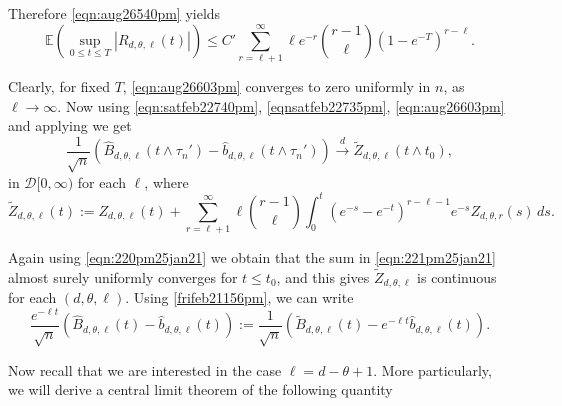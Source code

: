 \documentclass[11pt]{article}
\def\tod{\stackrel{d}{\longrightarrow}}
\newcommand{\cD}{\mathcal{D}}
\def\tod{\stackrel{d}{\longrightarrow}}
\begin{document}
Therefore \eqref{eqn:aug26540pm} yields 
\begin{equation}\label{eqn:aug26603pm}
\mathbb{E}\left( \sup_{0\leq t\leq T}\left|R_{d,\theta,\ell}(t)\right|\right) \leq C'  \sum_{r=\ell+1}^{\infty}\ell e^{-r} {r-1\choose \ell} (1-e^{-T})^{r-\ell}.
\end{equation}


Clearly, for fixed $T$, \eqref{eqn:aug26603pm} converges to zero uniformly in $n$, as $\ell \rightarrow \infty$. Now using \eqref{eqn:satfeb22740pm}, \eqref{eqnsatfeb22735pm}, \eqref{eqn:aug26603pm} and applying \cite[Theorem 4.2]{billingsley2013convergence} we get
\begin{equation*}%
     \frac{1}{\sqrt{n}}\left(\widehat{B}_{d,\theta,\ell}(t \wedge \tau_n') - \widehat{b}_{d,\theta,\ell}(t \wedge \tau_n')\right) \tod \widetilde{Z}_{d,\theta,\ell}(t \wedge t_0),
    \end{equation*}
    in $\cD[0,\infty)$ for each $\ell$, where   
    \begin{equation}\label{eqn:221pm25jan21}
        \widetilde{Z}_{d,\theta,\ell}(t) := Z_{d,\theta,\ell}(t)
    +\sum_{r=\ell+1}^{\infty}\ell{r-1\choose \ell}\int_{0}^t(e^{-s}-e^{-t})^{r-\ell-1}e^{-s} Z_{d,\theta,r}(s) \, ds. 
    \end{equation}

 Again using \eqref{eqn:220pm25jan21} we obtain that the sum in \eqref{eqn:221pm25jan21} almost surely uniformly converges for $t\leq t_0$, and this gives $\widetilde{Z}_{d,\theta,\ell}$ is continuous for each $(d,\theta,\ell)$. Using \eqref{frifeb21156pm}, we can write 
 $$
 \frac{e^{-\ell t}}{\sqrt{n}}\left(\widehat{B}_{d,\theta,\ell}(t ) - \widehat{b}_{d,\theta,\ell}(t )\right) :=  \frac{1}{\sqrt{n}}\left(\widetilde{B}_{d,\theta,\ell}(t) - e^{-\ell t}\widehat{b}_{d,\theta,\ell}(t )\right) .
 $$
 
 
 Now recall that we are interested in the case $\ell=d-\theta+1$. More particularly, we will derive a central limit theorem of the following quantity 
    
\end{document}
